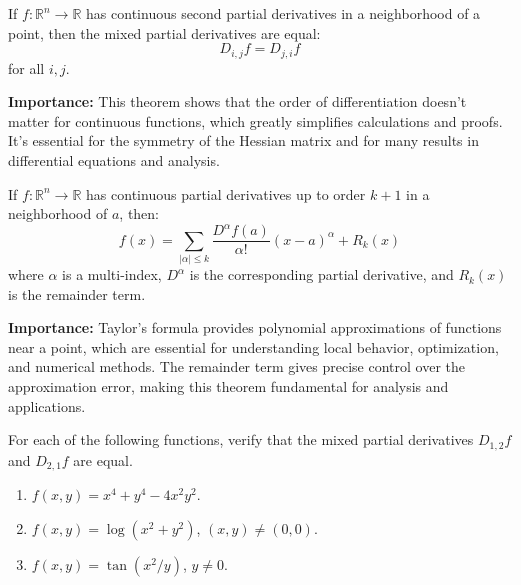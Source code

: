 \begin{theorem}
If $f: \mathbb{R}^n \to \mathbb{R}$ has continuous second partial derivatives in a neighborhood of a point, then the mixed partial derivatives are equal:
\[D_{i,j} f = D_{j,i} f\]
for all $i, j$.
\end{theorem}

\noindent\textbf{Importance:} This theorem shows that the order of differentiation doesn't matter for continuous functions, which greatly simplifies calculations and proofs. It's essential for the symmetry of the Hessian matrix and for many results in differential equations and analysis.



\begin{theorem}
If $f: \mathbb{R}^n \to \mathbb{R}$ has continuous partial derivatives up to order $k+1$ in a neighborhood of $a$, then:
\[f(x) = \sum_{|\alpha| \leq k} \frac{D^\alpha f(a)}{\alpha!}(x-a)^\alpha + R_k(x)\]
where $\alpha$ is a multi-index, $D^\alpha$ is the corresponding partial derivative, and $R_k(x)$ is the remainder term.
\end{theorem}

\noindent\textbf{Importance:} Taylor's formula provides polynomial approximations of functions near a point, which are essential for understanding local behavior, optimization, and numerical methods. The remainder term gives precise control over the approximation error, making this theorem fundamental for analysis and applications.





\begin{problembox}
\begin{problemstatement}
For each of the following functions, verify that the mixed partial derivatives \( D_{1,2}f \) and \( D_{2,1}f \) are equal.
\begin{enumerate}[label=(\alph*)]
\item \( f(x, y) = x^4 + y^4 - 4x^2y^2 \).
\item \( f(x, y) = \log (x^2 + y^2) \), \( (x, y) \neq (0, 0) \).
\item \( f(x, y) = \tan (x^2/y) \), \( y \neq 0 \).
\end{enumerate}
\end{problemstatement}
\end{problembox}

